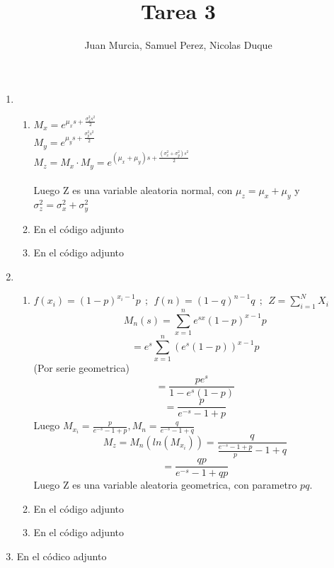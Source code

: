 \documentclass[14pt]{article}
\begin{document}
	\title{Tarea 3}
	\author{Juan Murcia, Samuel Perez, Nicolas Duque}
	\maketitle
	
	\begin{enumerate}
		\item \begin{enumerate}
			\item $M_x = e^{\mu_{x}s+\frac{\sigma_{x}^2s^2}{2}}$\\
			$M_y = e^{\mu_{y}s+\frac{\sigma_{y}^2s^2}{2}}$\\
			$M_z = M_x\cdot M_y = e^{(\mu_x+\mu_y)s+\frac{(\sigma_x^2+\sigma_y^2)s^2}{2}}$\\\\
			Luego Z es una variable aleatoria normal, con $\mu_z=\mu_x+\mu_y$ y $\sigma_z^2=\sigma_x^2+\sigma_y^2$\\
		\item En el código adjunto
		\item En el código adjunto\\
		\end{enumerate}
	\item \begin{enumerate}
		\item $f(x_i) = (1-p)^{x_i-1}p~~;~~f(n)=(1-q)^{n-1}q~~;~~Z=\sum_{i=1}^{N}X_i$
		$$M_n(s)=\sum_{x=1}^{n}e^{sx}(1-p)^{x-1}p$$
		$$= e^s\sum_{x=1}^{n}(e^s(1-p))^{x-1}p$$
		(Por serie geometrica)$$ = \frac{pe^s}{1-e^s(1-p)}$$
		$$= \frac{p}{e^{-s}-1+p}$$
		Luego $M_{x_i}=\frac{p}{e^{-s}-1+p},M_n=\frac{q}{e^{-s}-1+q}$\\
		$$M_z=M_n(ln(M_{x_i}))=\frac{q}{\frac{e^{-s}-1+p}{p}-1+q}
		$$
		$$= \frac{qp}{e^{-s}-1+qp}$$
		Luego Z es una variable aleatoria geometrica, con parametro $pq$.
		\item En el código adjunto
		\item En el código adjunto\\
	\end{enumerate}
	\item En el códico adjunto
	\end{enumerate}
\end{document}
